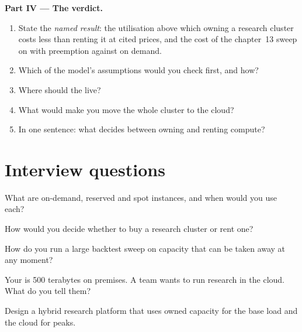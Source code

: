 \begin{problem}
\medskip\noindent\textbf{Part IV --- The verdict.}
\begin{enumerate}[resume]
\item State the \emph{named result}: the utilisation above which owning a research cluster costs less than renting it at cited prices, and
the cost of the chapter~13 sweep on  with preemption against on demand.
\item Which of the model's assumptions would you check first, and how?
\item Where should the  live?
\item What would make you move the whole cluster to the cloud?
\item In one sentence: what decides between owning and renting compute?
\end{enumerate}
\end{problem}

\section{Interview questions}

\begin{interviewq}\label{iq:pl:cloud-against-on-premises:1}
What are on-demand, reserved and spot instances, and when would you use each?
\end{interviewq}

\begin{interviewq}\label{iq:pl:cloud-against-on-premises:2}
How would you decide whether to buy a research cluster or rent one?
\end{interviewq}

\begin{interviewq}\label{iq:pl:cloud-against-on-premises:3}
How do you run a large backtest sweep on capacity that can be taken away at any moment?
\end{interviewq}

\begin{interviewq}\label{iq:pl:cloud-against-on-premises:4}
Your  is 500 terabytes on premises. A team wants to run research in the cloud. What do you tell them?
\end{interviewq}

\begin{interviewq}\label{iq:pl:cloud-against-on-premises:5}
Design a hybrid research platform that uses owned capacity for the base load and the cloud for peaks.
\end{interviewq}
